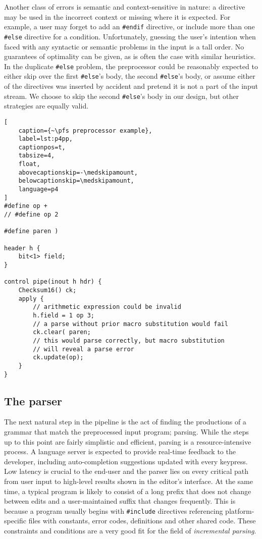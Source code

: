 Another class of errors is semantic and context-sensitive in nature: a directive
may be used in the incorrect context or missing where it is expected. For
example, a user may forget to add an \texttt{\#endif} directive, or include more
than one \texttt{\#else} directive for a condition. Unfortunately, guessing the
user's intention when faced with any syntactic or semantic problems in the input
is a tall order. No guarantees of optimality can be given, as is often the case
with similar heuristics. In the duplicate \texttt{\#else} problem, the
preprocessor could be reasonably expected to either skip over the first
\texttt{\#else}'s body, the second \texttt{\#else}'s body, or assume either of
the directives was inserted by accident and pretend it is not a part of the
input stream. We choose to skip the second \texttt{\#else}'s body in our design,
but other strategies are equally valid.

\begin{lstlisting}[
	caption={~\pfs preprocessor example},
	label=lst:p4pp,
	captionpos=t,
	tabsize=4,
	float,
	abovecaptionskip=-\medskipamount,
	belowcaptionskip=\medskipamount,
	language=p4
]
#define op +
// #define op 2

#define paren )

header h {
	bit<1> field;
}

control pipe(inout h hdr) {
	Checksum16() ck;
	apply {
		// arithmetic expression could be invalid
		h.field = 1 op 3;
		// a parse without prior macro substitution would fail
		ck.clear( paren;
		// this would parse correctly, but macro substitution
		// will reveal a parse error
		ck.update(op);
	}
}
\end{lstlisting}


\subsection{The parser}

The next natural step in the pipeline is the act of finding the productions of a
\pfs grammar that match the preprocessed input program; parsing. While the steps
up to this point are fairly simplistic and efficient, parsing is a
resource-intensive process. A language server is expected to provide real-time
feedback to the developer, including auto-completion suggestions updated with
every keypress. Low latency is crucial to the end-user and the
parser lies on every critical path from user input to high-level results shown
in the editor's interface. At the same time, a typical \pfs program is likely to
consist of a long prefix that does not change between edits and a
user-maintained suffix that changes frequently. This is because a \pfs program
usually begins with \texttt{\#include} directives referencing platform-specific
files with constants, error codes, \extern{} definitions and other shared code.
These constraints and conditions are a very good fit for the field of
\emph{incremental parsing}.

